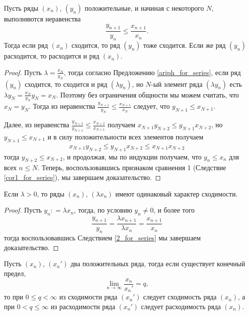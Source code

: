 \begin{corollary}\label{2_for_series}
    Пусть ряды $(x_n)$, $(y_n)$ положительные, и начиная с некоторого $N$, выполняются неравенства 
    \[
     \frac{y_{n+1}}{y_n} \le \frac{x_{n+1}}{x_n}.
    \]
Тогда если ряд $(x_n)$ сходится, то ряд $(y_n)$ тоже сходится. Если же ряд $(y_n)$ расходится, то расходится и ряд $(x_n).$
\end{corollary}
\begin{proof}
    Пусть $\lambda = \frac{x_N}{y_N}$, тогда согласно Предложению \ref{ariph_for_series}, если ряд $(y_n)$ сходится, то сходится и ряд $(\lambda y_n)$, но $N$-ый элемент ряда $(\lambda y_n)$ есть $\lambda y_N = \frac{x_N}{y_N}y_N = x_N$. Поэтому без ограничения общности мы можем считать, что $x_N = y_N.$ Тогда из неравенства $\frac{y_{N+1}}{y_N} \le \frac{x_{N+1}}{x_N}$ следует, что $y_{N+1} \le x_{N+1}$.

    Далее, из неравенства $\frac{y_{N+2}}{y_{N+1}} \le \frac{x_{N+2}}{x_{N+1}}$ получаем $x_{N+1}y_{N+2} \le y_{N+1} x_{N+2}$, но $y_{N+1} \le x_{N+1}$ и в силу положительности всех элементов получаем 
    \[
     x_{N+1}y_{N+2} \le y_{N+1} x_{N+2} \le x_{N+1}x_{N+2}
    \]
    тогда $y_{N+2} \le x_{N+2}$, и продолжая, мы по индукции получаем, что $y_n \le x_n$ для всех $n \le N$. Теперь, воспользовавшись признаком сравнения 1 (Следствие \ref{cor1_for_series}), мы завершаем доказательство.
\end{proof}

\begin{corollary}\label{cor_for_similar}
  Если $\lambda >0$, то ряды $(x_n)$, $(\lambda x_n)$ имеют одинаковый характер сходимости.
\end{corollary}
\begin{proof}
    Пусть $y_n : = \lambda x_n$, тогда, по условию $y_n \ne 0$, и более того
    \[
     \frac{y_{n+1}}{y_n} = \frac{\lambda x_{n+1}}{\lambda x_n} = \frac{x_{n+1}}{x_n}
    \]
    тогда воспользовавшись Следствием \ref{2_for_series} мы завершаем доказательство. 
\end{proof}

\begin{corollary}\label{critical_for_series}
    Пусть $(x_n)$, $(x_n')$ два положительных ряда, тогда если существует конечный предел,
    \[
     \lim_{n \to \infty} \frac{x_n}{x_n'} = q, 
    \]
    то при $0 \le q < \infty$ из сходимости ряда $(x_n')$ следует сходимость ряда $(x_n)$, а при $0 < q \le \infty$ из расходимости ряда $(x_n')$ следует расходимость ряда $(x_n).$
\end{corollary}

